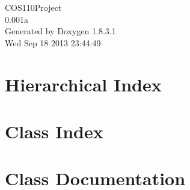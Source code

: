 \documentclass{book}
\begin{document}
\hypersetup{pageanchor=false,citecolor=blue}
\begin{titlepage}
\vspace*{7cm}
\begin{center}
{\Large C\-O\-S110\-Project \\[1ex]\large 0.\-001a }\\
\vspace*{1cm}
{\large Generated by Doxygen 1.8.3.1}\\
\vspace*{0.5cm}
{\small Wed Sep 18 2013 23:44:49}\\
\end{center}
\end{titlepage}
\clearemptydoublepage
{}
\tableofcontents
\clearemptydoublepage
{}
\hypersetup{pageanchor=true,citecolor=blue}
\chapter{Hierarchical Index}

\chapter{Class Index}

\chapter{Class Documentation}
























\printindex
\end{document}
